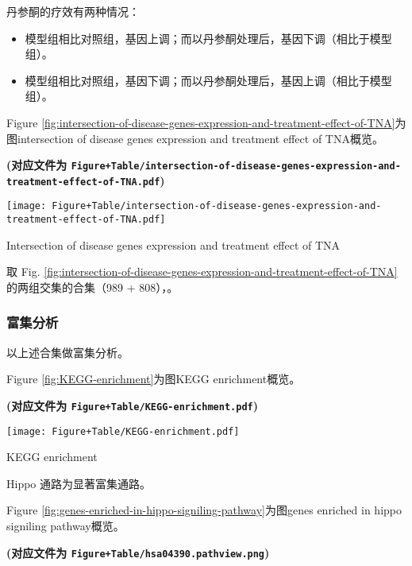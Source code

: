 \documentclass[
]{article}
\providecommand{\tightlist}{%
  \setlength{\itemsep}{0pt}\setlength{\parskip}{0pt}}
\begin{document}
丹参酮的疗效有两种情况：

\begin{itemize}
\tightlist
\item
  模型组相比对照组，基因上调；而以丹参酮处理后，基因下调（相比于模型组）。
\item
  模型组相比对照组，基因下调；而以丹参酮处理后，基因上调（相比于模型组）。
\end{itemize}

Figure \ref{fig:intersection-of-disease-genes-expression-and-treatment-effect-of-TNA}为图intersection of disease genes expression and treatment effect of TNA概览。

\textbf{(对应文件为 \texttt{Figure+Table/intersection-of-disease-genes-expression-and-treatment-effect-of-TNA.pdf})}

\def\@captype{figure}
\begin{center}
\texttt{[image: Figure+Table/intersection-of-disease-genes-expression-and-treatment-effect-of-TNA.pdf]}
\caption{Intersection of disease genes expression and treatment effect of TNA}\label{fig:intersection-of-disease-genes-expression-and-treatment-effect-of-TNA}
\end{center}

取 Fig. \ref{fig:intersection-of-disease-genes-expression-and-treatment-effect-of-TNA} 的两组交集的合集（989 + 808），。

\hypertarget{ux5bccux96c6ux5206ux6790}{%
\subsubsection{富集分析}\label{ux5bccux96c6ux5206ux6790}}

以上述合集做富集分析。

Figure \ref{fig:KEGG-enrichment}为图KEGG enrichment概览。

\textbf{(对应文件为 \texttt{Figure+Table/KEGG-enrichment.pdf})}

\def\@captype{figure}
\begin{center}
\texttt{[image: Figure+Table/KEGG-enrichment.pdf]}
\caption{KEGG enrichment}\label{fig:KEGG-enrichment}
\end{center}

Hippo 通路为显著富集通路。

Figure \ref{fig:genes-enriched-in-hippo-signiling-pathway}为图genes enriched in hippo signiling pathway概览。

\textbf{(对应文件为 \texttt{Figure+Table/hsa04390.pathview.png})}
\end{document}
